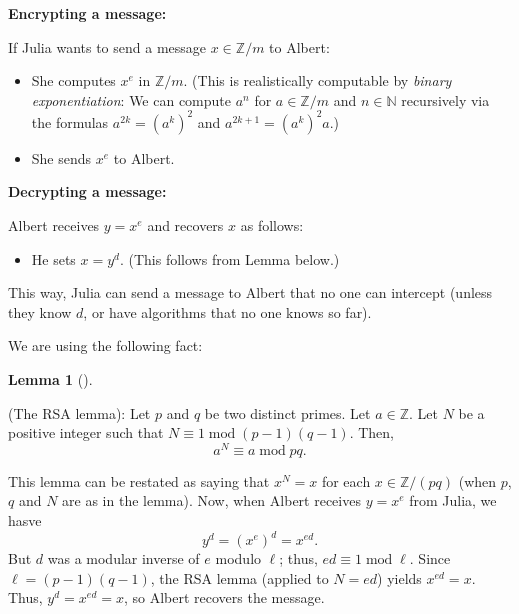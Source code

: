 \documentclass[numbers=enddot,12pt,final,onecolumn,notitlepage]{scrartcl}%
\numberwithin{exer}{subsection}
\theoremstyle{definition}
\newtheorem{lem}[theo]{Lemma}
\newenvironment{lemma}[1][]
{\begin{lem}[#1]\begin{leftbar}}
{\end{leftbar}\end{lem}}
\begin{document}
\textbf{Encrypting a message:}

If Julia wants to send a message $x\in\mathbb{Z}/m$ to Albert:

\begin{itemize}
\item She computes $x^{e}$ in $\mathbb{Z}/m$. (This is realistically
computable by \textit{binary exponentiation}: We can compute $a^{n}$ for
$a\in\mathbb{Z}/m$ and $n\in\mathbb{N}$ recursively via the formulas
$a^{2k}=\left(  a^{k}\right)  ^{2}$ and $a^{2k+1}=\left(  a^{k}\right)  ^{2}a$.)

\item She sends $x^{e}$ to Albert.
\end{itemize}

\textbf{Decrypting a message:}

Albert receives $y=x^{e}$ and recovers $x$ as follows:

\begin{itemize}
\item He sets $x=y^{d}$. (This follows from Lemma below.)
\end{itemize}

This way, Julia can send a message to Albert that no one can intercept (unless
they know $d$, or have algorithms that no one knows so far).

We are using the following fact:

\begin{lemma}
(The RSA lemma): Let $p$ and $q$ be two distinct primes. Let $a\in\mathbb{Z}$.
Let $N$ be a positive integer such that $N\equiv1\operatorname{mod}\left(
p-1\right)  \left(  q-1\right)  $. Then,%
\[
a^{N}\equiv a\operatorname{mod}pq.
\]

\end{lemma}

This lemma can be restated as saying that $x^{N}=x$ for each $x\in
\mathbb{Z}/\left(  pq\right)  $ (when $p$, $q$ and $N$ are as in the lemma).
Now, when Albert receives $y=x^{e}$ from Julia, we hasve%
\[
y^{d}=\left(  x^{e}\right)  ^{d}=x^{ed}.
\]
But $d$ was a modular inverse of $e$ modulo $\ell$; thus, $ed\equiv
1\operatorname{mod}\ell$. Since $\ell=\left(  p-1\right)  \left(  q-1\right)
$, the RSA lemma (applied to $N=ed$) yields $x^{ed}=x$. Thus, $y^{d}=x^{ed}%
=x$, so Albert recovers the message.
\end{document}
